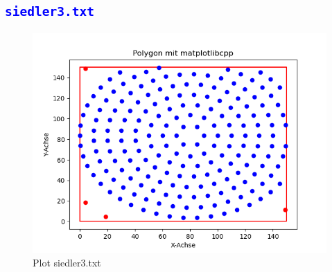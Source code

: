 \documentclass{article}
\begin{document}
\subsection{\textcolor{blue}{\texttt{siedler3.txt}}}
\begin{figure}[H]
    \centering
    \includegraphics[width=1\textwidth]{Bilder/Figure_3.png}
    \caption{Plot siedler3.txt}
\end{figure}
\end{document}
